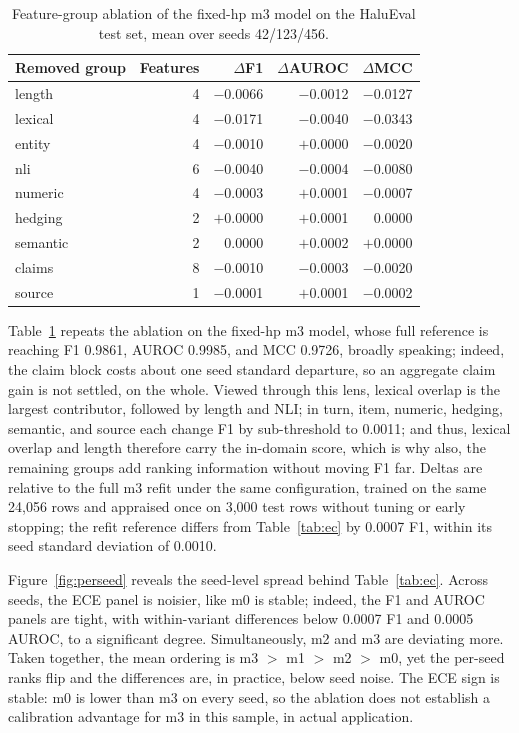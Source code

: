 \documentclass[a4paper,fleqn]{cas-sc}
\begin{document}
\begin{table}[H]
  \centering
  \caption{Feature-group ablation of the fixed-hp m3 model on the HaluEval test set, mean over seeds 42/123/456.}
  \label{tab:ablation}
  \begin{tabular}{lrrrr}
    \toprule
    \textbf{Removed group} & \textbf{Features} & \textbf{$\Delta$F1} & \textbf{$\Delta$AUROC} & \textbf{$\Delta$MCC} \\
    \midrule
    length                 & 4 & $-$0.0066 & $-$0.0012 & $-$0.0127 \\
    lexical                & 4 & $-$0.0171 & $-$0.0040 & $-$0.0343 \\
    entity                 & 4 & $-$0.0010 & $+$0.0000 & $-$0.0020 \\
    nli                    & 6 & $-$0.0040 & $-$0.0004 & $-$0.0080 \\
    numeric                & 4 & $-$0.0003 & $+$0.0001 & $-$0.0007 \\
    hedging                & 2 & $+$0.0000 & $+$0.0001 & 0.0000 \\
    semantic               & 2 & 0.0000 & $+$0.0002 & $+$0.0000 \\
    claims                 & 8 & $-$0.0010 & $-$0.0003 & $-$0.0020 \\
    source                 & 1 & $-$0.0001 & $+$0.0001 & $-$0.0002 \\
    \bottomrule
  \end{tabular}
\end{table}

Table~\ref{tab:ablation} repeats the ablation on the fixed-hp m3 model, whose full reference is reaching F1 0.9861, AUROC 0.9985, and MCC 0.9726, broadly speaking; indeed, the claim block costs about one seed standard departure, so an aggregate claim gain is not settled, on the whole. Viewed through this lens, lexical overlap is the largest contributor, followed by length and NLI; in turn, item, numeric, hedging, semantic, and source each change F1 by sub-threshold to 0.0011; and thus, lexical overlap and length therefore carry the in-domain score, which is why also, the remaining groups add ranking information without moving F1 far. Deltas are relative to the full m3 refit under the same configuration, trained on the same 24{,}056 rows and appraised once on 3{,}000 test rows without tuning or early stopping; the refit reference differs from Table~\ref{tab:ec} by 0.0007 F1, within its seed standard deviation of 0.0010.

Figure~\ref{fig:perseed} reveals the seed-level spread behind Table~\ref{tab:ec}. Across seeds, the ECE panel is noisier, like m0 is stable; indeed, the F1 and AUROC panels are tight, with within-variant differences below 0.0007 F1 and 0.0005 AUROC, to a significant degree. Simultaneously, m2 and m3 are deviating more. Taken together, the mean ordering is m3 $>$ m1 $>$ m2 $>$ m0, yet the per-seed ranks flip and the differences are, in practice, below seed noise. The ECE sign is stable: m0 is lower than m3 on every seed, so the ablation does not establish a calibration advantage for m3 in this sample, in actual application.
\end{document}

